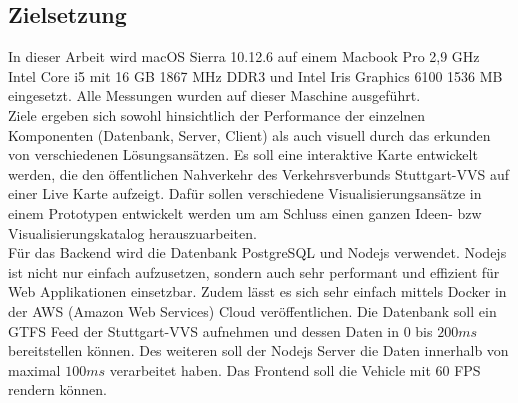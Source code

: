 \subsection{Zielsetzung}
\label{sub:zielsetzung}
  In dieser Arbeit wird macOS Sierra 10.12.6 auf einem Macbook Pro 2,9 GHz Intel Core i5 mit 16 GB 1867 MHz DDR3 und Intel Iris Graphics 6100 1536 MB eingesetzt. Alle Messungen wurden auf dieser Maschine ausgeführt.\\

  Ziele ergeben sich sowohl hinsichtlich der Performance der einzelnen Komponenten (Datenbank, Server, Client) als auch visuell durch das erkunden von verschiedenen Lösungsansätzen. Es soll eine interaktive Karte entwickelt werden, die den öffentlichen Nahverkehr des Verkehrsverbunds Stuttgart-VVS auf einer Live Karte aufzeigt. Dafür sollen verschiedene Visualisierungsansätze in einem Prototypen entwickelt werden um am Schluss einen ganzen Ideen- bzw Visualisierungskatalog herauszuarbeiten.\\

  Für das Backend wird die Datenbank PostgreSQL und Nodejs verwendet. Nodejs ist nicht nur einfach aufzusetzen, sondern auch sehr performant und effizient für Web Applikationen einsetzbar. Zudem lässt es sich sehr einfach mittels Docker in der AWS (Amazon Web Services) Cloud veröffentlichen. Die Datenbank soll ein GTFS Feed der Stuttgart-VVS aufnehmen und dessen Daten in $0$ bis $200ms$ bereitstellen können. Des weiteren soll der Nodejs Server die Daten innerhalb von maximal $100ms$ verarbeitet haben. Das Frontend soll die Vehicle mit 60 FPS rendern können.

